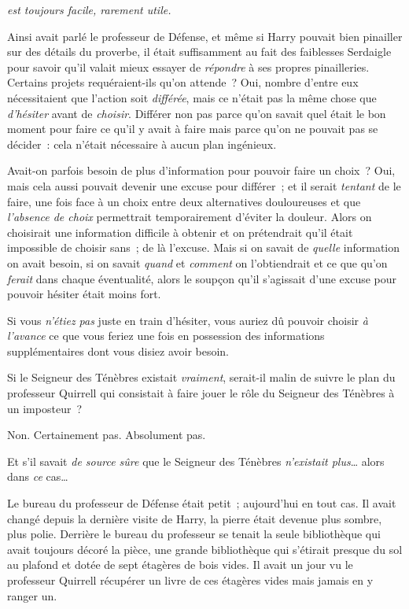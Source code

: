 
 \emph{est toujours facile, rarement utile.}

\hplettrineextrapara
Ainsi avait parlé le professeur de Défense, et même si Harry pouvait bien pinailler sur des détails du proverbe, il était suffisamment au fait des faiblesses Serdaigle pour savoir qu'il valait mieux essayer de \emph{répondre} à ses propres pinailleries. Certains projets requéraient-ils qu'on attende~? Oui, nombre d'entre eux nécessitaient que l'action soit \emph{différée}, mais ce n'était pas la même chose que \emph{d'hésiter} avant de \emph{choisir}. Différer non pas parce qu'on savait quel était le bon moment pour faire ce qu'il y avait à faire mais parce qu'on ne pouvait pas se décider~: cela n'était nécessaire à aucun plan ingénieux.

Avait-on parfois besoin de plus d'information pour pouvoir faire un choix~? Oui, mais cela aussi pouvait devenir une excuse pour différer~; et il serait \emph{tentant} de le faire, une fois face à un choix entre deux alternatives douloureuses et que \emph{l'absence de choix} permettrait temporairement d'éviter la douleur. Alors on choisirait une information difficile à obtenir et on prétendrait qu'il était impossible de choisir sans~; de là l'excuse. Mais si on savait de \emph{quelle} information on avait besoin, si on savait \emph{quand} et \emph{comment} on l'obtiendrait et ce que qu'on \emph{ferait} dans chaque éventualité, alors le soupçon qu'il s'agissait d'une excuse pour pouvoir hésiter était moins fort.

Si vous \emph{n'étiez pas} juste en train d'hésiter, vous auriez dû pouvoir choisir \emph{à l'avance} ce que vous feriez une fois en possession des informations supplémentaires dont vous disiez avoir besoin.

Si le Seigneur des Ténèbres existait \emph{vraiment}, serait-il malin de suivre le plan du professeur Quirrell qui consistait à faire jouer le rôle du Seigneur des Ténèbres à un imposteur~?

Non. Certainement pas. Absolument pas.

Et s'il savait \emph{de source sûre} que le Seigneur des Ténèbres \emph{n'existait plus}… alors dans \emph{ce} cas…

Le bureau du professeur de Défense était petit~; aujourd'hui en tout cas. Il avait changé depuis la dernière visite de Harry, la pierre était devenue plus sombre, plus polie. Derrière le bureau du professeur se tenait la seule bibliothèque qui avait toujours décoré la pièce, une grande bibliothèque qui s'étirait presque du sol au plafond et dotée de sept étagères de bois vides. Il avait un jour vu le professeur Quirrell récupérer un livre de ces étagères vides mais jamais en y ranger un.

